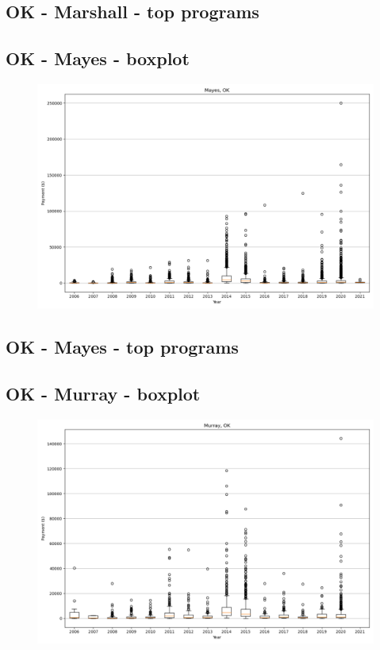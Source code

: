 \subsection*{OK - Marshall - top programs}

\newpage
\subsection*{OK - Mayes - boxplot}
\begin{figure}[h]
\centering
\includegraphics[width=7in]{../output/boxplots/counties/Mayes-OK_boxplot.png}
\end{figure}


\subsection*{OK - Mayes - top programs}

\newpage
\subsection*{OK - Murray - boxplot}
\begin{figure}[h]
\centering
\includegraphics[width=7in]{../output/boxplots/counties/Murray-OK_boxplot.png}
\end{figure}


